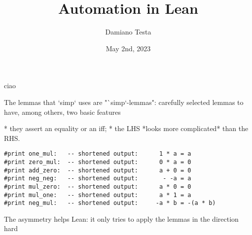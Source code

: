 \documentclass{beamer}
\title{Automation in Lean}
\author{Damiano Testa}
\institute{University of Warwick}
\date{May 2nd, 2023}
\begin{document}
%



%


\frame{\titlepage}

\begin{frame}[fragile]{ciao}


The lemmas that `simp` uses are "`simp`-lemmas": carefully selected lemmas to have, among others, two basic features

* they assert an equality or an iff;
* the LHS *looks more complicated* than the RHS.

\begin{verbatim}
#print one_mul:   -- shortened output:      1 * a = a
#print zero_mul:  -- shortened output:      0 * a = 0
#print add_zero:  -- shortened output:      a + 0 = 0
#print neg_neg:   -- shortened output:       - -a = a
#print mul_zero:  -- shortened output:      a * 0 = 0
#print mul_one:   -- shortened output:      a * 1 = a
#print neg_mul:   -- shortened output:     -a * b = -(a * b)
\end{verbatim}

The asymmetry helps Lean: it only tries to apply the lemmas in the direction hard %


\end{frame}
\end{document}
